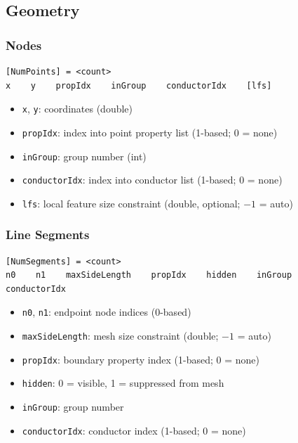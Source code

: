 \documentclass[11pt]{article}
\begin{document}
\subsection{Geometry}

\subsubsection{Nodes}

\begin{lstlisting}
[NumPoints] = <count>
x    y    propIdx    inGroup    conductorIdx    [lfs]
\end{lstlisting}

\begin{itemize}[nosep]
  \item \texttt{x}, \texttt{y}: coordinates (double)
  \item \texttt{propIdx}: index into point property list (1-based; 0 = none)
  \item \texttt{inGroup}: group number (int)
  \item \texttt{conductorIdx}: index into conductor list (1-based; 0 = none)
  \item \texttt{lfs}: local feature size constraint (double, optional; $-1$ = auto)
\end{itemize}

\subsubsection{Line Segments}

\begin{lstlisting}
[NumSegments] = <count>
n0    n1    maxSideLength    propIdx    hidden    inGroup    conductorIdx
\end{lstlisting}

\begin{itemize}[nosep]
  \item \texttt{n0}, \texttt{n1}: endpoint node indices (0-based)
  \item \texttt{maxSideLength}: mesh size constraint (double; $-1$ = auto)
  \item \texttt{propIdx}: boundary property index (1-based; 0 = none)
  \item \texttt{hidden}: 0 = visible, 1 = suppressed from mesh
  \item \texttt{inGroup}: group number
  \item \texttt{conductorIdx}: conductor index (1-based; 0 = none)
\end{itemize}
\end{document}
